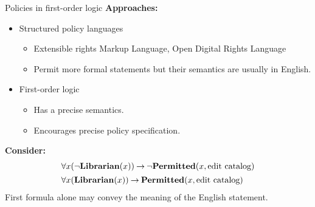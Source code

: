 \documentclass[style=sailor,size=12pt]{powerdot}
\begin{document}
\begin{wideslide}[bm=,toc=]{Policies in first-order logic}
\textbf{Approaches:}
\begin{itemize}
\item<2-> Structured policy languages
\begin{itemize}
\item<3-> Extensible rights Markup Language, Open Digital Rights Language
\item<4-> Permit more formal statements but their semantics are usually in English.
\end{itemize}
\item<2-> First-order logic 
\begin{itemize}
\item<5-> Has a precise semantics.
\item<6-> Encourages precise policy specification. 
\end{itemize}
\end{itemize}
\pause[6]
\textbf{Consider:}
\vspace{-2mm}
\begin{displaymath}
\begin{array}{l}
\forall x(\neg\mbox{\bf Librarian}(x))\mathbin{\rightarrow} \neg\mbox{\bf Permitted}(x,\mbox{\rm edit catalog}) \\[1ex]
\forall x(\mbox{\bf Librarian}(x))\mathbin{\rightarrow} \mbox{\bf Permitted}(x,\mbox{\rm edit catalog})
\end{array}
\end{displaymath}
\vspace{3mm}
\pause
First formula alone may convey the meaning of the English statement.
\end{wideslide}
\end{document}
